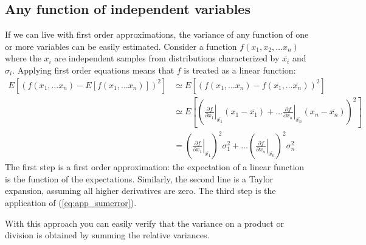\subsection{Any function of independent variables}
If we can live with first order approximations, the variance of any function
of one or more variables can be easily estimated. Consider a function
$f(x_1, x_2, \ldots x_n)$ where the $x_i$ are independent samples from
distributions characterized by $\overline{x_i}$ and $\sigma_i$. Applying first order
equations means that $f$ is treated as a linear function:
\begin{align}
  E\left[\left( f(x_1, \ldots x_n) - E\left[f(x_1, \ldots x_n)\right]\right)^2\right]
  &\simeq  E\left[\left( f(x_1,\ldots x_n) 
        - f(\overline{x_1}, \ldots \overline{x_n})\right)^2\right] \nonumber \\
  &\simeq  E\left[\left( \left. \frac{\partial f}{\partial x_1} \right|_{\overline{x_1}}
                 (x_1 - \overline{x_1}) + \ldots
            \left. \frac{\partial f}{\partial x_n} \right|_{\overline{x_n}}
                 (x_n - \overline{x_n}) \right)^2\right] \nonumber \\
  &= \left( \left. \frac{\partial f}{\partial x_1} \right|_{\overline{x_1}} \right)^2
        \sigma_1^2 + \ldots
    \left( \left. \frac{\partial f}{\partial x_n} \right|_{\overline{x_n}} \right)^2
         \sigma_n^2
\end{align}
The first step is a first order approximation: the expectation of a linear
function is the function of the expectations. Similarly, the second line is a
Taylor expansion, assuming all higher derivatives are zero. The third step is
the application of (\ref{eq:app_sumerror}).

With this approach you can easily verify that the variance on a product or
division is obtained by summing the relative variances.

\newpage
